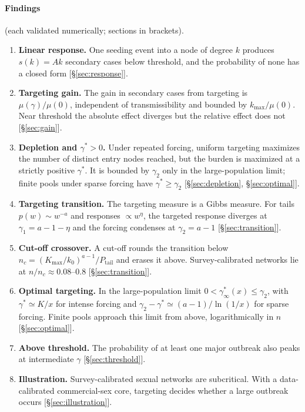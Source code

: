 \documentclass[11pt,a4paper]{article}
\theoremstyle{definition}
\theoremstyle{remark}
\begin{document}
\paragraph{Findings} (each validated numerically; sections in brackets).
\begin{enumerate}
\item \textbf{Linear response.} One seeding event into a node of degree $k$ produces
$s(k)=Ak$ secondary cases below threshold, and the probability of none has a
closed form [\S\ref{sec:response}].
\item \textbf{Targeting gain.} The gain in secondary cases from targeting is
$\mu(\gamma)/\mu(0)$, independent of transmissibility and bounded by $k_{\max}/\mu(0)$. Near
threshold the absolute effect diverges but the relative effect does not
[\S\ref{sec:gain}].
\item \textbf{Depletion and $\gamma^*>0$.} Under repeated forcing, uniform targeting
maximizes the number of distinct entry nodes reached, but the burden is
maximized at a strictly positive $\gamma^*$. It is bounded by $\gamma_2$ only in the
large-population limit; finite pools under sparse forcing have $\gamma^*\ge\gamma_2$
[\S\ref{sec:depletion}, \S\ref{sec:optimal}].
\item \textbf{Targeting transition.} The targeting measure is a Gibbs measure. For
tails $p(w)\sim w^{-a}$ and responses $\propto w^\eta$, the targeted response diverges at
$\gamma_1=a-1-\eta$ and the forcing condenses at $\gamma_2=a-1$ [\S\ref{sec:transition}].
\item \textbf{Cut-off crossover.} A cut-off rounds the transition below
$n_c=(K_{\max}/k_0)^{a-1}/P_{\mathrm{tail}}$ and erases it above. Survey-calibrated networks lie
at $n/n_c\approx0.08$--$0.8$ [\S\ref{sec:transition}].
\item \textbf{Optimal targeting.} In the large-population limit $0<\gamma^*_\infty(x)\le\gamma_2$, with
$\gamma^*\simeq K/x$ for intense forcing and $\gamma_2-\gamma^*\simeq(a-1)/\ln(1/x)$ for sparse forcing.
Finite pools approach this limit from above, logarithmically in $n$
[\S\ref{sec:optimal}].
\item \textbf{Above threshold.} The probability of at least one major outbreak also
peaks at intermediate $\gamma$ [\S\ref{sec:threshold}].
\item \textbf{Illustration.} Survey-calibrated sexual networks are subcritical. With
a data-calibrated commercial-sex core, targeting decides whether a large
outbreak occurs [\S\ref{sec:illustration}].
\end{enumerate}
\end{document}
